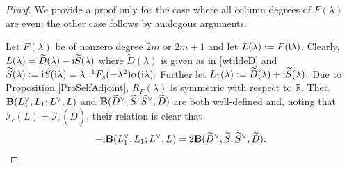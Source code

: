 \documentclass[12pt,reqno]{amsart}
\theoremstyle{plain}
\numberwithin{equation}{section}
\theoremstyle{remark}
\def\wtilde{\widetilde} \def\what{\widehat}
\begin{document}
\begin{proof}
We provide a proof only for the case where all column degrees of $F(\lambda)$ are even; the other case follows by analogous arguments.

Let $F(\lambda)$ be of nonzero degree $2m$ or $2m+1$ and let 
$L(\lambda):=F({\rm i}\lambda)$.
Clearly,
$
L(\lambda)=\wtilde D(\lambda)-{\rm i}\wtilde S(\lambda)
$
where $\wtilde D(\lambda)$ is given as in \eqref{wtildeD} and 
$
\wtilde S(\lambda):={\rm i}S({\rm i}\lambda)= \lambda^{-1} F_s(-\lambda^2)\alpha({\rm i}\lambda).
$ Further let
$
L_1(\lambda):=\wtilde D(\lambda)+{\rm i} \wtilde S(\lambda).
$
Due to Proposition \ref{ProSelfAdjoint}, $R_F(\lambda)$ is symmetric with respect to $\mathbb R$. Then ${\bf B}(L_1^{\vee},L_1;L^{\vee},L)$ and ${\bf B}(\wtilde D^{\vee},\wtilde S;\wtilde S^{\vee},\wtilde D)$ are both well-defined and, noting that $\mathcal I_c(L)=\mathcal I_c(\wtilde D)$, their relation is clear that
 \begin{equation}\label{-BB}
 -{\rm i}{\bf B}(L_1^{\vee},L_1;L^{\vee},L)=2{\bf B}(\wtilde D^{\vee},\wtilde S;\wtilde S^{\vee},\wtilde D).
 \end{equation}




\end{proof}
\end{document}
